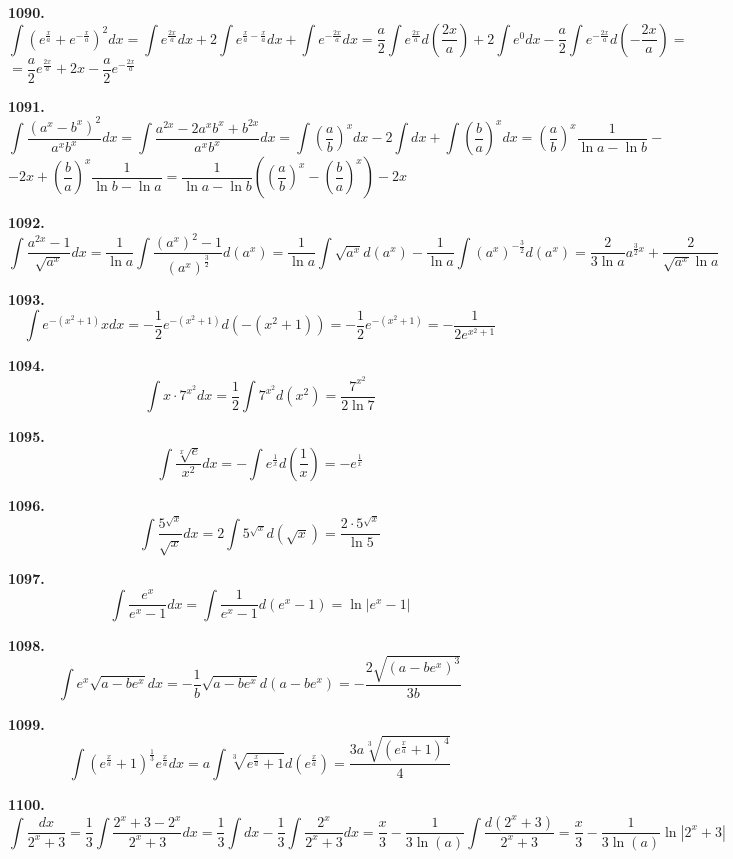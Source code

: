 \documentclass[12pt]{article}
\begin{document}
	{\bf 1090.} \[
		\int (e^{\frac{x}{a}}+e^{-\frac{x}{a}})^2dx = \int e^{\frac{2x}{a}} dx + 2\int e^{\frac{x}{a}-\frac{x}{a}}dx + \int e^{-\frac{2x}{a}}dx = \dfrac{a}{2} \int e^{\frac{2x}{a}} d\left(\frac{2x}{a}\right) + 2\int e^0dx - \dfrac{a}{2}\int e^{-\frac{2x}{a}}d\left(-\frac{2x}{a}\right) = 
	\]
	$
	 = \dfrac{a}{2}e^\frac{2x}{a} + 2x-\dfrac{a}{2}e^{-\frac{2x}{a}}
	$
	
	\bigskip
	{\bf 1091.} \[
		\int \dfrac{(a^x-b^x)^2}{a^x b^x}dx = \int \dfrac{a^{2x}-2a^x b^x+ b^{2x}}{a^x b^x}dx = \int \left(\dfrac{a}{b}\right)^xdx - 2\int dx + \int \left(\frac{b}{a}\right)^xdx = \left(\dfrac{a}{b}\right)^x\dfrac{1}{\ln a - \ln b} - 
	\]
	$
	-2x + \left(\dfrac{b}{a}\right)^x \dfrac{1}{\ln b-\ln a} = \dfrac{1}{\ln a-\ln b} \left(\left(\dfrac{a}{b}\right)^x - \left(\dfrac{b}{a}\right)^x\right) -2x
	$
	
	\bigskip
	{\bf 1092.} \[
		\int \dfrac{a^{2x}-1}{\sqrt{a^x}}dx = \dfrac{1}{\ln a}\int \dfrac{(a^x)^2-1}{(a^x)^\frac{3}{2}}d(a^x) = \dfrac{1}{\ln a}\int \sqrt{a^x}d(a^x) - \dfrac{1}{\ln a} \int (a^x)^{-\frac{3}{2}}d(a^x) = \dfrac{2}{3\ln a}a^{\frac{3}{2}x} + \dfrac{2}{\sqrt{a^x}\ln a} 
	\]
	
	{\bf 1093.} \[
		\int e^{-(x^2+1)}x dx = -\dfrac{1}{2}e^{-(x^2+1)}d(-(x^2+1)) = -\dfrac{1}{2}e^{-(x^2+1)} = -\dfrac{1}{2e^{x^2+1}}
	\]
	
	{\bf 1094.} \[
		\int x\cdot 7^{x^2}dx = \dfrac{1}{2}\int 7^{x^2}d(x^2) = \dfrac{7^{x^2}}{2\ln7}
	\]
	
	{\bf 1095.} \[
		\int\dfrac{\sqrt[x]{e}}{x^2}dx = -\int e^\frac{1}{x}d\left(\dfrac{1}{x}\right) = -e^\frac{1}{x}
	\]
	
	{\bf 1096.} \[
		\int \dfrac{5^{\sqrt{x}}}{\sqrt{x}}dx = 2\int 5^{\sqrt{x}}d(\sqrt{x}) = \dfrac{2 \cdot5^{\sqrt{x}}}{\ln 5}
	\]
	
	
	{\bf 1097.} \[
		\int \dfrac{e^x}{e^x-1} dx = \int \dfrac{1}{e^x-1}d(e^x-1) = \ln|e^x-1|
	\]
	
	{\bf 1098.} \[
		\int e^x\sqrt{a-be^x}dx = -\dfrac{1}{b}\sqrt{a-be^x}d(a-be^x) = -\dfrac{2\sqrt{(a-be^x)^3}}{3b}
	\]
	
	{\bf 1099.} \[
		\int (e^{\frac{x}{a}}+1)^{\frac{1}{3}}e^{\frac{x}{a}} dx = a\int\sqrt[3]{e^{\frac{x}{a}}+1}d(e^{\frac{x}{a}}) = \dfrac{3a\sqrt[3]{(e^{\frac{x}{a}}+1)^4}}{4}
	\]
	
	{\bf 1100.} \[
		\int\dfrac{dx}{2^x+3} = \dfrac{1}{3}\int \dfrac{2^x+3-2^x}{2^x+3}dx = \dfrac{1}{3}\int dx - \dfrac{1}{3}\int \dfrac{2^x}{2^x+3}dx = \dfrac{x}{3} - \dfrac{1}{3\ln(a)}\int \dfrac{d(2^x+3)}{2^x+3} = \dfrac{x}{3} - \dfrac{1}{3\ln(a)}\ln|2^x+3|
	\]
	
\end{document}
